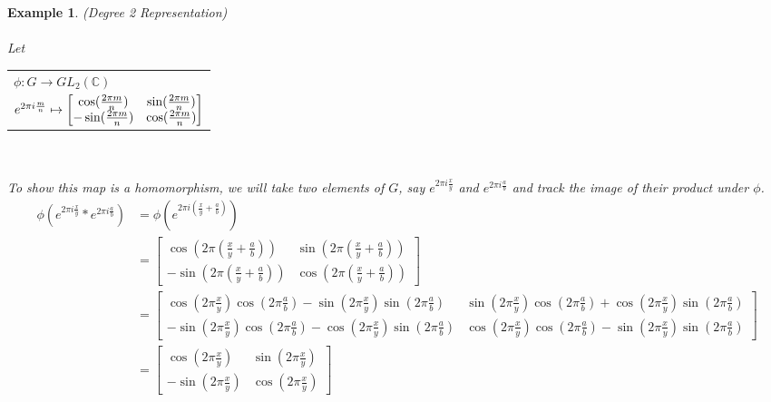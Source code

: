 \documentclass[10pt]{ucthesis}
\newtheorem{example}[definition]{Example}
\begin{document}
\begin{example}
	(Degree 2 Representation) \\\\
	\renewcommand{\arraystretch}{1}
	Let   \begin{tabular}{l}$\phi:G\rightarrow GL_2(\mathbb{C})$\\
		$\hspace{0mm}e^{2\pi i\frac{m}{n}}\mapsto \begin{bmatrix}
							\cos(\frac{2\pi m}{n}) & \sin(\frac{2\pi m}{n}) \\
							-\sin(\frac{2\pi m}{n}) & \cos(\frac{2\pi m}{n})
						      \end{bmatrix}$
		\end{tabular} \\\\
	To show this map is a homomorphism, we will take two elements of $G$, say $e^{2\pi i\frac{x}{y}}$ and $e^{2\pi i\frac{a }{b}}$ and track the image of their product under $\phi$. \\
	\begin{equation}
		\begin{aligned}
			\phi(e^{2\pi i\frac{x}{y}} * e^{2\pi i\frac{a}{b}} ) &= \phi(e^{2\pi i(\frac{x}{y}+\frac{a}{b})})\\ 
												    &= \begin{bmatrix}
														\cos(2\pi(\frac{x}{y}+\frac{a}{b})) & \sin(2\pi(\frac{x}{y}+\frac{a}{b})) \\
														-\sin(2\pi(\frac{x}{y}+\frac{a}{b})) & \cos(2\pi(\frac{x}{y}+\frac{a}{b}))
													  \end{bmatrix}\\
												    &= \begin{bmatrix}
														\cos(2\pi\frac{x}{y})\cos(2\pi\frac{a}{b}) - \sin(2\pi\frac{x}{y})\sin(2\pi\frac{a}{b})   &\sin(2\pi\frac{x}{y})\cos(2\pi\frac{a}{b}) + \cos(2\pi\frac{x}{y})\sin(2\pi\frac{a}{b})\\
														-\sin(2\pi\frac{x}{y})\cos(2\pi\frac{a}{b}) - \cos(2\pi\frac{x}{y})\sin(2\pi\frac{a}{b}) & \cos(2\pi\frac{x}{y})\cos(2\pi\frac{a}{b}) - \sin(2\pi\frac{x}{y})\sin(2\pi\frac{a}{b})
													  \end{bmatrix}\\ 
												    &= \begin{bmatrix}
														\cos(2\pi\frac{x}{y}) & \sin(2\pi\frac{x}{y}) \\
														-\sin(2\pi\frac{x}{y}) & \cos(2\pi\frac{x}{y})
												          \end{bmatrix}

\end{aligned}
\end{equation}
\end{example}
\end{document}
